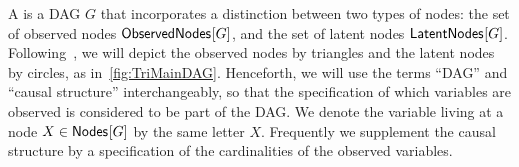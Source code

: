 A  is a DAG $G$ that incorporates a distinction between two types of nodes: the set of observed nodes ${\operatorname{\mathsf{ObservedNodes}}_{}}\lbrack G\rbrack$, and the set of latent nodes ${\operatorname{\mathsf{LatentNodes}}_{}}\lbrack G\rbrack$.  %
Following~\cite{pusey2014gdag}, we will depict the observed nodes by triangles and the latent nodes by circles, as in~\cref{fig:TriMainDAG}.
Henceforth, we will use the terms ``DAG'' and ``causal structure'' interchangeably, so that the specification of which variables are observed is considered to be part of the DAG.
We denote the variable living at a node $X\in{\operatorname{\mathsf{Nodes}}_{}}\lbrack G\rbrack$ by the same letter $X$. Frequently we supplement the causal structure by a specification of the cardinalities of the observed variables.

